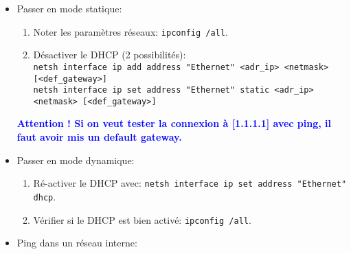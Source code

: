 \documentclass[a4paper]{article}
\renewcommand{\tt}{\texttt}
\begin{document}
\begin{itemize}





\item Passer en mode statique:
\begin{enumerate}
    \item Noter les paramètres réseaux: \tt{ipconfig /all}.
    \item Désactiver le DHCP (2 possibilités): \\
    \tt{netsh interface ip add address "Ethernet" <adr\_ip> <netmask> [<def\_gateway>]} \\
    \tt{netsh interface ip set address "Ethernet" static <adr\_ip> <netmask> [<def\_gateway>]}
\end{enumerate}

\begin{center} \textcolor{blue}{\textbf{Attention ! Si on veut tester la connexion à [1.1.1.1] avec ping, il faut avoir mis un default gateway.}} \end{center}





\item Passer en mode dynamique:
\begin{enumerate}
    \item Ré-activer le DHCP avec: \tt{netsh interface ip set address "Ethernet" dhcp}.
    \item Vérifier si le DHCP est bien activé: \tt{ipconfig /all}.
\end{enumerate}





\item Ping dans un réseau interne:
\begin{center}
\end{center}
\end{itemize}
\end{document}
